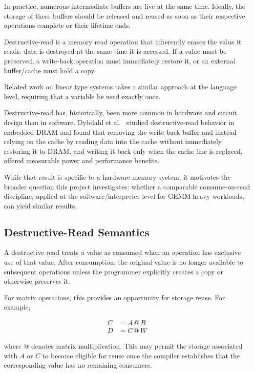 \documentclass[a4paper]{article}
\begin{document}
	In practice, numerous intermediate buffers are live at the same time. Ideally, the storage of these buffers should be released and reused as soon as their respective operations complete or their lifetime ends.
	
	
	Destructive-read is a memory read operation that inherently erases the value it reads: data is destroyed at the same time it is accessed. If a value must be preserved, a write-back operation must immediately restore it, or an external buffer/cache must hold a copy.
	
	Related work on linear type systems takes a similar approach at the language level, requiring that a variable be used exactly once.
	
	Destructive-read has, historically, been more common in hardware and circuit design than in software. Dybdahl et al.~\cite{DybdahlKGN06} studied destructive-read behavior in embedded DRAM and found that removing the write-back buffer and instead relying on the cache by reading data into the cache without immediately restoring it to DRAM, and writing it back only when the cache line is replaced, offered measurable power and performance benefits. 
	
	While that result is specific to a hardware memory system, it motivates the broader question this project investigates: whether a comparable consume-on-read discipline, applied at the software/interpreter level for GEMM-heavy workloads, can yield similar results.
	
	
	\subsection{Destructive-Read Semantics}
	
	A destructive read treats a value as consumed when an operation has exclusive use of that value. After consumption, the original value is no longer available to subsequent operations unless the programmer explicitly creates a copy or otherwise preserves it.
	
	For matrix operations, this provides an opportunity for storage reuse. For example,
	
	\begin{align*}
		C &= A \mathbin{@} B\\
		D &= C \mathbin{@} W
	\end{align*}
	
	\noindent where $\mathbin{@}$ denotes matrix multiplication. This may permit the storage associated with $A$ or $C$ to become eligible for reuse once the compiler establishes that the corresponding value has no remaining consumers.
	
\end{document}
